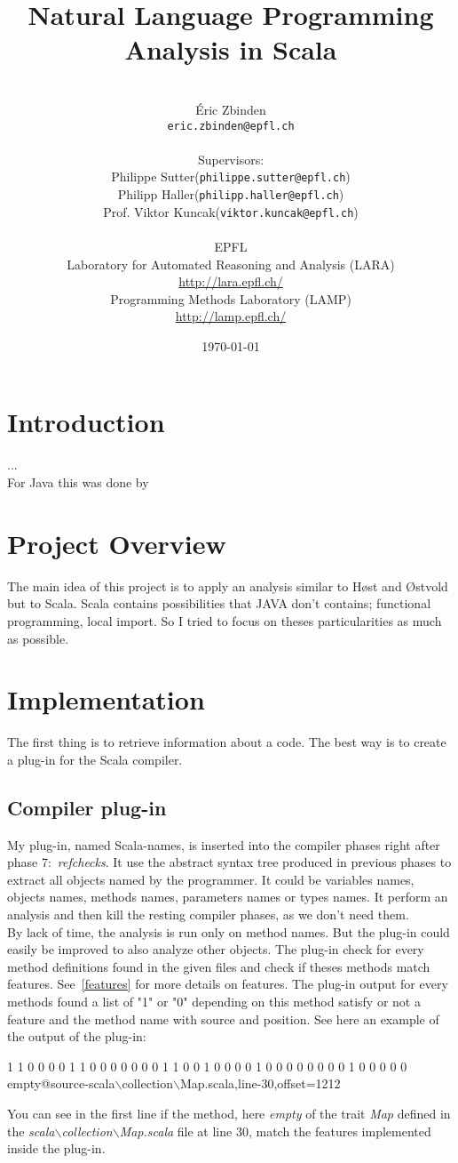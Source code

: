 \documentclass[12pt]{article}
\title{Natural Language Programming Analysis in Scala}
\author{\\ \'Eric Zbinden \\ \texttt{eric.zbinden@epfl.ch} \\ \\ Supervisors: \\Philippe Sutter(\texttt{philippe.sutter@epfl.ch})\\ Philipp Haller(\texttt{philipp.haller@epfl.ch})\\Prof. Viktor Kuncak(\texttt{viktor.kuncak@epfl.ch}) \\ \\ EPFL\\ Laboratory for Automated Reasoning and Analysis (LARA) \\ \url{http://lara.epfl.ch/}\\ Programming Methods Laboratory (LAMP) \\ \url{http://lamp.epfl.ch/} }
\date{\today}
\newcommand{\code}[1]{{\fontfamily{phv}\selectfont \small{\begin{tabbing} #1 \end{tabbing}}}}
\begin{document}
\maketitle
\newpage
\tableofcontents
\newpage

\section{Introduction}
...\\
For Java this was done by  

\section {Project Overview}
The main idea of this project is to apply an analysis similar to H{\o}st and {\O}stvold~\cite{DebugMN} but to Scala. Scala contains possibilities that JAVA don't contains; functional programming, local import. So I tried to focus on theses particularities as much as possible.

\section {Implementation}
The first thing is to retrieve information about a code. The best way is to create a plug-in for the Scala compiler. 

\subsection{Compiler plug-in}
My plug-in, named Scala-names, is inserted into the compiler phases right after phase 7:~\textit{refchecks}. It use the abstract syntax tree produced in previous phases to extract all objects named by the programmer. It could be variables names, objects names, methods names, parameters names or types names. It perform an analysis and then kill the resting compiler phases, as we don't need them.\\

By lack of time, the analysis is run only on method names. But the plug-in could easily be improved to also analyze other objects.
The plug-in check for every method definitions found in the given files and check if theses methods match features. See~\ref{features} for more details on features. The plug-in output for every methods found a list of "1" or "0" depending on this method satisfy or not a feature and the method name with source and position. See here an example of the output of the plug-in:
\code{1 1 0 0 0 0 1 1 0 0 0 0 0 0 0 1 1 0 0 1 0 0 0 0 1 0 0 0 0 0 0 0 0 1 0 0 0 0 0 \\empty@source-scala$\backslash$collection$\backslash$Map.scala,line-30,offset=1212}
You can see in the first line if the method, here \textit{empty} of the trait \textit{Map} defined in the \textit{scala$\backslash$collection$\backslash$Map.scala} file at line 30, match the features implemented inside the plug-in.
\end{document}
